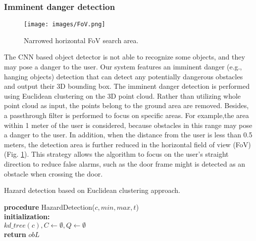 \documentclass{ieeeaccess}
\begin{document}
\subsubsection{Imminent danger detection}
\begin{figure}[t]
    \centering
    \texttt{[image: images/FoV.png]}
    \caption{Narrowed horizontal FoV search area.}
    \label{fig:Fov}
\end{figure}



The CNN based object detector is not able to recognize some objects, and they may pose a danger to the user.
Our system features an imminent danger (e.g., hanging objects) detection that can detect any potentially dangerous obstacles and output their 3D bounding box.  The imminent danger detection is performed using Euclidean clustering on the 3D point cloud. Rather than utilizing whole point cloud as input, the points belong to the ground area are removed. Besides, a passthrough filter is performed to focus on specific areas. For example,the area within 1 meter of the user is considered, because obstacles in this range may pose a danger to the user. In addition, when the distance from the user is less than 0.5 meters, the detection area is further reduced in the horizontal field of view (FoV) (Fig. \ref{fig:Fov}). This strategy allows the algorithm to focus on the user's straight direction to reduce false alarms, such as the door frame might is detected as an obstacle when crossing the door. 
\begin{algorithm}
\caption{Hazard detection based on Euclidean clustering approach.}
\label{alg:EcludeanClustering}
{}     
\textbf{procedure} HazardDetection($c, min, max, t$) \\
\Indp
\textbf{initialization:}  \\
\quad $kd\_tree(c), C \leftarrow \emptyset, Q\leftarrow \emptyset$ \\
\textbf{return} $obL$
\end{algorithm}
\end{document}
